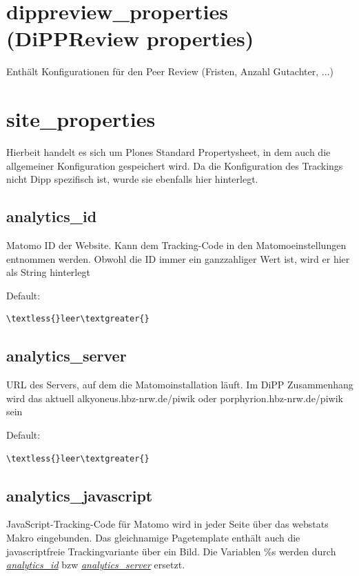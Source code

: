 \documentclass[a4paper,10pt,ngerman]{sphinxmanual}
\begin{document}
\section{dippreview\_properties (DiPPReview properties)}
\label{dippreview_properties:dippreview-properties-dippreview-properties}\label{dippreview_properties::doc}
Enthält Konfigurationen für den Peer Review (Fristen, Anzahl Gutachter,
...)


\section{site\_properties}
\label{site_properties:site-properties}\label{site_properties::doc}
Hierbeit handelt es sich um Plones Standard Propertysheet, in dem auch die allgemeiner Konfiguration
gespeichert wird. Da die Konfiguration des Trackings nicht Dipp spezifisch ist, wurde sie ebenfalls
hier hinterlegt.


\subsection{analytics\_id}
\label{site_properties:analytics-id}\label{site_properties:id1}
Matomo ID der Website. Kann dem Tracking-Code in den Matomoeinstellungen entnommen werden.
Obwohl die ID immer ein ganzzahliger Wert ist, wird er hier als String hinterlegt

Default:

\begin{Verbatim}[commandchars=\\\{\}]
\textless{}leer\textgreater{}
\end{Verbatim}


\subsection{analytics\_server}
\label{site_properties:id2}\label{site_properties:analytics-server}
URL des Servers, auf dem die Matomoinstallation läuft. Im DiPP Zusammenhang wird das
aktuell alkyoneus.hbz-nrw.de/piwik oder porphyrion.hbz-nrw.de/piwik sein

Default:

\begin{Verbatim}[commandchars=\\\{\}]
\textless{}leer\textgreater{}
\end{Verbatim}


\subsection{analytics\_javascript}
\label{site_properties:analytics-javascript}\label{site_properties:id3}
JavaScript-Tracking-Code für Matomo wird in jeder Seite über das webstats Makro eingebunden.
Das gleichnamige Pagetemplate enthält auch die javascriptfreie Trackingvariante über ein Bild.
Die Variablen \%s werden durch {\hyperref[site_properties:analytics-id]{\emph{analytics\_id}}} bzw {\hyperref[site_properties:analytics-server]{\emph{analytics\_server}}} ersetzt.
\end{document}

